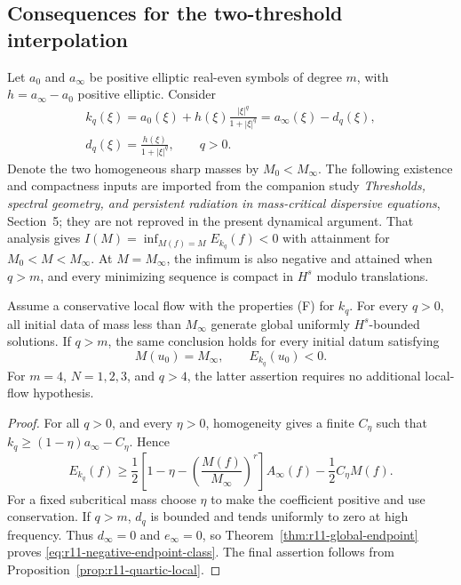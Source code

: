 \subsection{Consequences for the two-threshold interpolation}

Let $a_0$ and $a_\infty$ be positive elliptic real-even symbols of degree
$m$, with $h=a_\infty-a_0$ positive elliptic.  Consider
\begin{equation}\label{eq:r11-rational-symbol}
 \begin{gathered}
 k_q(\xi)=a_0(\xi)+h(\xi)\frac{|\xi|^q}{1+|\xi|^q}
         =a_\infty(\xi)-d_q(\xi),\\
 d_q(\xi)=\frac{h(\xi)}{1+|\xi|^q},\qquad q>0.
 \end{gathered}
\end{equation}
Denote the two homogeneous sharp masses by $M_0<M_\infty$.
The following existence and compactness inputs are imported from the
companion study \emph{Thresholds, spectral geometry, and persistent
radiation in mass-critical dispersive equations}, Section~5; they are
not reproved in the present dynamical argument.  That analysis gives
$I(M)=\inf_{M(f)=M}E_{k_q}(f)<0$ with attainment for
$M_0<M<M_\infty$.  At $M=M_\infty$, the infimum is also negative
and attained when $q>m$, and every minimizing sequence is compact in
$H^s$ modulo translations.

\begin{corollary}
\label{cor:r11-rational-global}
Assume a conservative local flow with the properties \textup{(F)} for
$k_q$.  For every $q>0$, all initial data of mass less than
$M_\infty$ generate global uniformly $H^s$-bounded solutions.
If $q>m$, the same conclusion holds for every initial datum satisfying
\begin{equation}\label{eq:r11-negative-endpoint-class}
 M(u_0)=M_\infty,\qquad E_{k_q}(u_0)<0.
\end{equation}
For $m=4$, $N=1,2,3$, and $q>4$, the latter assertion requires no
additional local-flow hypothesis.
\end{corollary}

\begin{proof}
For all $q>0$, and every $\eta>0$, homogeneity gives a finite
$C_\eta$ such that
$k_q\ge(1-\eta)a_\infty-C_\eta$.  Hence
\[
 E_{k_q}(f)\ge\frac12
 \left[1-\eta-\left(\frac{M(f)}{M_\infty}\right)^r\right]A_\infty(f)
       -\frac12C_\eta M(f).
\]
For a fixed subcritical mass choose $\eta$ to make the coefficient
positive and use conservation.  If $q>m$, $d_q$ is bounded and tends
uniformly to zero at high frequency.  Thus $d_\infty=0$ and
$e_\infty=0$, so Theorem~\ref{thm:r11-global-endpoint} proves
\eqref{eq:r11-negative-endpoint-class}.  The final assertion follows
from Proposition~\ref{prop:r11-quartic-local}.
\end{proof}

